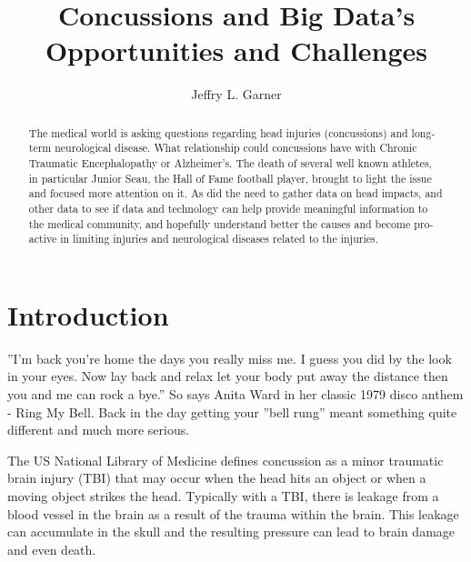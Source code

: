 \documentclass[sigconf]{acmart}
\begin{document}
\title{Concussions and Big Data's Opportunities and Challenges}



\author{Jeffry L. Garner}

\begin{abstract}

The medical world is asking questions regarding head injuries (concussions) and long-term neurological disease.  What relationship could concussions have with Chronic Traumatic Encephalopathy or Alzheimer's.  The death of several well known athletes, in particular Junior Seau, the Hall of Fame football player, brought to light the issue and focused more attention on it.  As did the need to gather data on head impacts, and other data to see if data and technology can help provide meaningful information to the medical community, and hopefully understand better the causes and become pro-active in limiting injuries and neurological diseases related to the injuries. 

\end{abstract}



\maketitle

\section{Introduction}

''I'm back you're home the days you really miss me.  I guess you did by the look in your eyes. Now lay back and relax let your body put away the distance then you and me can rock a bye.''  So says Anita Ward in her classic 1979 disco anthem - Ring My Bell. Back in the day getting your ''bell rung'' meant something quite different and much more serious.  

The US National Library of Medicine defines concussion as a minor traumatic brain injury (TBI) that may occur when the head hits an object or when a moving object strikes the head.  Typically with a TBI, there is leakage from a blood vessel in the brain as a result of the trauma within the brain.  This leakage can accumulate in the skull and the resulting pressure can lead to brain damage and even death.  
\end{document}
